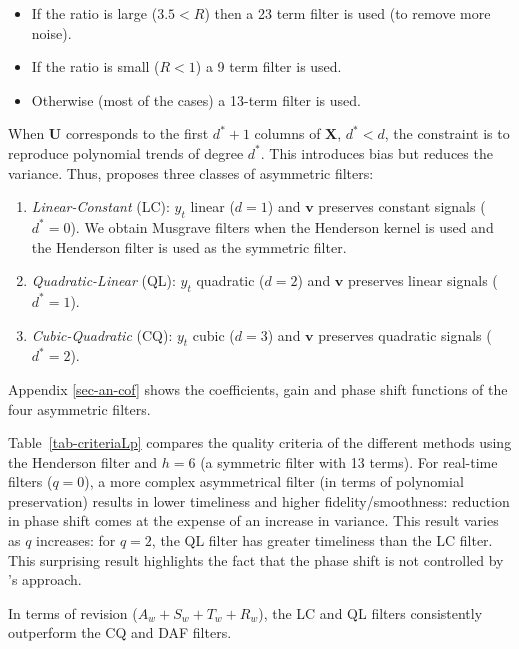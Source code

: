 \documentclass[
]{article}
\newcommand\1{\mathds{1}}
\begin{document}
\begin{itemize}
\item
  If the ratio is large (\(3.5< R\)) then a 23 term filter is used (to
  remove more noise).
\item
  If the ratio is small (\(R<1\)) a 9 term filter is used.
\item
  Otherwise (most of the cases) a 13-term filter is used.
\end{itemize}

When \(\boldsymbol U\) corresponds to the first \(d^*+1\) columns of
\(\boldsymbol X\), \(d^*<d\), the constraint is to reproduce polynomial
trends of degree \(d^*\). This introduces bias but reduces the variance.
Thus, \textcite{proietti2008} proposes three classes of asymmetric
filters:

\begin{enumerate}
\def\labelenumi{\arabic{enumi}.}
\item
  \emph{Linear-Constant} (LC): \(y_t\) linear (\(d=1\)) and
  \(\boldsymbol v\) preserves constant signals (\(d^*=0\)). We obtain
  Musgrave filters when the Henderson kernel is used and the Henderson
  filter is used as the symmetric filter.
\item
  \emph{Quadratic-Linear} (QL): \(y_t\) quadratic (\(d=2\)) and
  \(\boldsymbol v\) preserves linear signals (\(d^*=1\)).
\item
  \emph{Cubic-Quadratic} (CQ): \(y_t\) cubic (\(d=3\)) and
  \(\boldsymbol v\) preserves quadratic signals (\(d^*=2\)).
\end{enumerate}

Appendix \ref{sec-an-cof} shows the coefficients, gain and phase shift
functions of the four asymmetric filters.

Table~\ref{tab-criteriaLp} compares the quality criteria of the
different methods using the Henderson filter and \(h=6\) (a symmetric
filter with 13 terms). For real-time filters (\(q=0\)), a more complex
asymmetrical filter (in terms of polynomial preservation) results in
lower timeliness and higher fidelity/smoothness: reduction in phase
shift comes at the expense of an increase in variance. This result
varies as \(q\) increases: for \(q=2\), the QL filter has greater
timeliness than the LC filter. This surprising result highlights the
fact that the phase shift is not controlled by \textcite{proietti2008}'s
approach.

In terms of revision (\(A_w+S_w+T_w+R_w\)), the LC and QL filters
consistently outperform the CQ and DAF filters.
\end{document}
